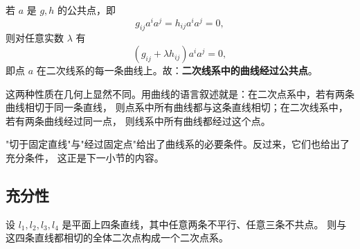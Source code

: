 若 $a$ 是 $g,h$ 的公共点，即
\[
g_{ij}a^ia^j=h_{ij}a^ia^j=0 ,
\]
则对任意实数 $\lambda$ 有
\[
(g_{ij}+\lambda h_{ij})a^ia^j=0 ,
\]
即点 $a$ 在二次线系的每一条曲线上。故：\textbf{二次线系中的曲线经过公共点}。

这两种性质在几何上显然不同。用曲线的语言叙述就是：在二次点系中，若有两条曲线相切于同一条直线，
则点系中所有曲线都与这条直线相切；在二次线系中，若有两条曲线经过同一点，
则线系中所有曲线都经过这个点。

"切于固定直线"与"经过固定点"给出了曲线系的必要条件。反过来，它们也给出了充分条件，
这正是下一小节的内容。

\subsection{充分性}

\begin{proposition}[相切于四条定直线的二次点系]\label{prop:tangent-family}
设 $l_1,l_2,l_3,l_4$ 是平面上四条直线，其中任意两条不平行、任意三条不共点。
则与这四条直线都相切的全体二次点构成一个二次点系。
\end{proposition}

